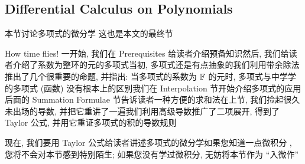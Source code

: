 \subsection*{Differential Calculus on Polynomials}

本节讨论多项式的微分学 \period 这也是本文的最终节\period

How time flies! 一开始, 我们在 Prerequisites 给读者介绍预备知识\period 然后, 我们给读者介绍了系数为整环的元的多项式\period 当初, 多项式还是有点抽象的\period 我们利用带余除法推出了几个很重要的命题, 并指出: 当多项式的系数为 $\mathbb{F}$ 的元时, 多项式与中学学的多项式 (函数) 没有根本上的区别\period 我们在 Interpolation 节开始介绍多项式的应用\period 后面的 Summation Formulae 节告诉读者一种方便的求和法\period 在上节, 我们捡起很久未出场的导数, 并把它重讲了一遍\period 我们利用高级导数推广了二项展开, 得到了 Taylor 公式, 并用它重证多项式的积的导数规则\period

现在, 我们要用 Taylor 公式给读者讲述多项式的微分学\period 如果您知道一点微积分 , 您将不会对本节感到特别陌生; 如果您没有学过微积分, 无妨将本节作为 ``入微作''\period
